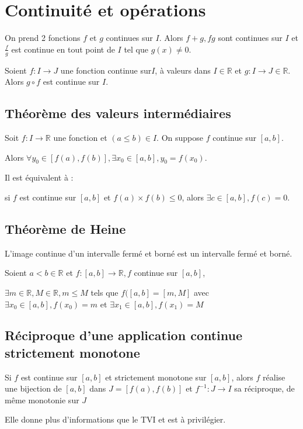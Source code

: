 \documentclass[french]{yLectureNote}
\begin{document}
\section{Continuité et opérations}
On prend 2 fonctions $f$ et $g$ continues sur $I$. Alors $f+g, fg$ sont continues sur $I$ et $\frac{f}{g}$ est continue en tout point de $I$ tel que $g(x)\neq 0$.

\begin{theorem}
Soient $f : I\to J$ une fonction continue sur$I$, à valeurs dans $I\in\mathbb{R}$ et $g:I\to J\in\mathbb{R}$. Alors $g\circ f$ est continue sur $I$.
\end{theorem}
\subsection{Théorème des valeurs intermédiaires}
\begin{theorem}[TVI]
Soit $f:I\to\mathbb{R}$ une fonction et $(a \leq b)\in I$. On suppose $f$ continue sur $[a,b]$.

Alors $\forall y_0 \in [f(a),f(b)], \exists x_0\in[a,b], y_0=f(x_0)$.
\end{theorem}
\begin{theorem}
Il est équivalent à :

si $f$ est continue sur $[a,b]$ et $f(a)\times f(b) \leq 0$, alors $\exists c\in[a,b], f(c)=0$.
\end{theorem}

\subsection{Théorème de Heine}
\begin{theorem}
L'image continue d'un intervalle fermé et borné est un intervalle fermé et borné.

Soient $ a<b \in\mathbb{R}$ et $f:[a,b] \to \mathbb{R}, f$ continue sur $[a,b]$,

$\exists m\in\mathbb{R},M\in\mathbb{R}, m\leq M$ tels que $f([a,b] = [m,M]$ avec $\exists x_0\in[a,b], f(x_0) = m$ et $\exists x_1\in[a,b], f(x_1) = M$
\end{theorem}

\subsection{Réciproque d'une application continue strictement monotone}
\begin{theorem}[]
Si $f$ est continue sur $[a,b]$ et strictement monotone sur $[a,b]$, alors $f$  réalise une bijection de $[a,b]$ dans $J=[f(a),f(b)]$ et $f^{-1} : J\to I$ sa réciproque, de m\^eme monotonie sur $J$
\end{theorem}
Elle donne plus d'informations que le TVI et est à privilégier.
\end{document}
